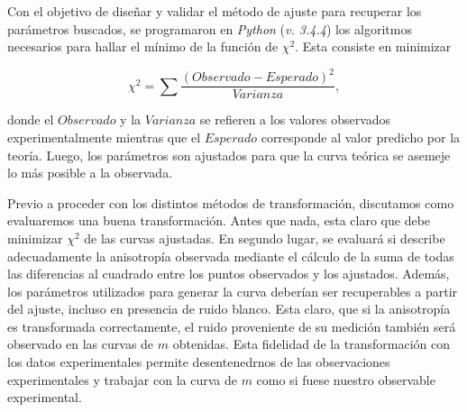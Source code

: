 Con el objetivo de diseñar y validar el método de ajuste para recuperar los parámetros buscados, se programaron en \textit{Python} (\textit{v. 3.4.4}) los algoritmos necesarios para hallar el mínimo de la función de $\chi ^2$. Esta consiste en minimizar

\begin{equation}
    \chi ^2 = \sum \frac{(Observado - Esperado)^2}{Varianza},
\end{equation}

\noindent donde el $Observado$ y la $Varianza$ se refieren a los valores observados experimentalmente mientras que el $Esperado$ corresponde al valor predicho por la teoría. Luego, los parámetros son ajustados para que la curva teórica se asemeje lo más posible a la observada. %

Previo a proceder con los distintos métodos de transformación, discutamos como evaluaremos una buena transformación. Antes que nada, esta claro que debe minimizar $\chi ^2$ de las curvas ajustadas. En segundo lugar, se evaluará si describe adecuadamente la anisotropía observada mediante el cálculo de la suma de todas las diferencias al cuadrado entre los puntos observados y los ajustados. Además, los parámetros utilizados para generar la curva deberían ser recuperables a partir del ajuste, incluso en presencia de ruido blanco. Esta claro, que si la anisotropía es transformada correctamente, el ruido proveniente de su medición también será observado en las curvas de $m$ obtenidas. Esta fidelidad de la transformación con los datos experimentales permite desentenedrnos de las observaciones experimentales y trabajar con la curva de $m$ como si fuese nuestro observable experimental. %




